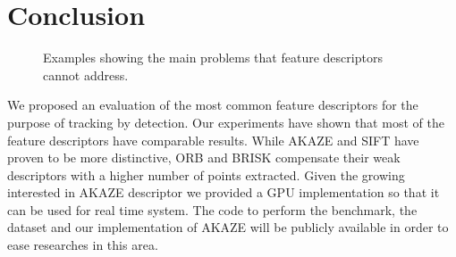 \section{Conclusion}

\begin{figure}[b]
	\vspace{2mm}
\centerline{%
	}
	\vspace{-2mm}
\caption{Examples showing the main problems that feature descriptors cannot address. }
\label{fig:tracking_results_scale}
\end{figure} 



We proposed an evaluation of the most common feature descriptors for the purpose of tracking by detection. Our experiments have shown that most of the feature descriptors have comparable results. While AKAZE and SIFT have proven to be more distinctive, ORB and BRISK compensate their weak descriptors with a higher number of points extracted. Given the growing interested in AKAZE descriptor we provided a GPU implementation so that it can be used for real time system. The code to perform the benchmark, the dataset and our implementation of AKAZE will be publicly available in order to ease researches in this area.



